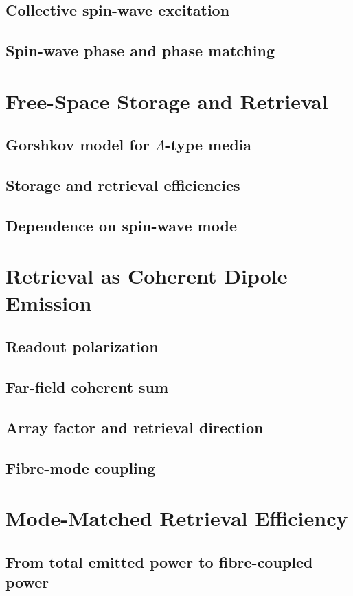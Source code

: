 \subsection{Collective spin-wave excitation}
\subsection{Spin-wave phase and phase matching}

\section{Free-Space Storage and Retrieval}
\subsection{Gorshkov model for $\Lambda$-type media}
\subsection{Storage and retrieval efficiencies}
\subsection{Dependence on spin-wave mode}

\section{Retrieval as Coherent Dipole Emission}
\subsection{Readout polarization}
\subsection{Far-field coherent sum}
\subsection{Array factor and retrieval direction}
\subsection{Fibre-mode coupling}

\section{Mode-Matched Retrieval Efficiency}
\subsection{From total emitted power to fibre-coupled power}
